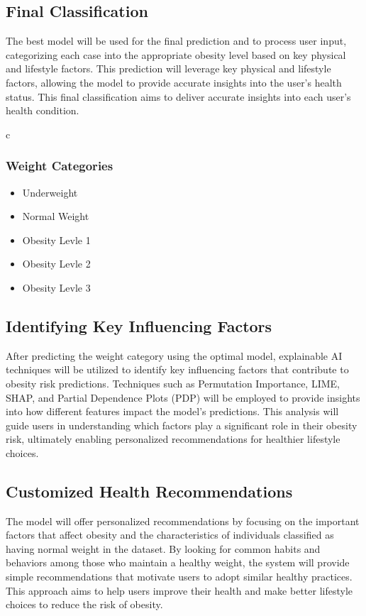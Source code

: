 \subsection{Final Classification}

The best model will be used for the final prediction and to process user input, categorizing each case into the appropriate obesity level based on key physical and lifestyle factors. This prediction will leverage key physical and lifestyle factors, allowing the model to provide accurate insights into the user’s health status. This final classification aims to deliver accurate insights into each user’s health condition. 

 

 

c\subsubsection{Weight Categories }
\begin{itemize}
    \item Underweight 

    \item Normal Weight 

    \item Obesity Levle 1 

    \item Obesity Levle 2 

   \item Obesity Levle 3 
\end{itemize}
\subsection{Identifying Key Influencing Factors }

After predicting the weight category using the optimal model, explainable AI techniques will be utilized to identify key influencing factors that contribute to obesity risk predictions. Techniques such as Permutation Importance, LIME, SHAP, and Partial Dependence Plots (PDP) will be employed to provide insights into how different features impact the model's predictions. This analysis will guide users in understanding which factors play a significant role in their obesity risk, ultimately enabling personalized recommendations for healthier lifestyle choices. 

 

\subsection{Customized Health Recommendations }
The model will offer personalized recommendations by focusing on the important factors that affect obesity and the characteristics of individuals classified as having normal weight in the dataset. By looking for common habits and behaviors among those who maintain a healthy weight, the system will provide simple recommendations that motivate users to adopt similar healthy practices. This approach aims to help users improve their health and make better lifestyle choices to reduce the risk of obesity. 


